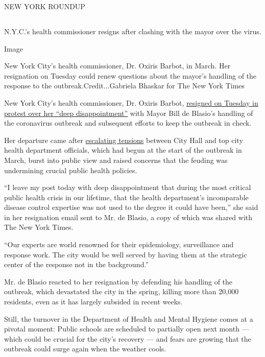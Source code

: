 NEW YORK ROUNDUP

\hypertarget{-6}{%
\subsection{}\label{-6}}

N.Y.C.'s health commissioner resigns after clashing with the mayor over
the virus.

Image

New York City's health commissioner, Dr. Oxiris Barbot, in March. Her
resignation on Tuesday could renew questions about the mayor's handling
of the response to the outbreak.Credit...Gabriela Bhaskar for The New
York Times

New York City's health commissioner, Dr. Oxiris Barbot,
\href{https://www.nytimes3xbfgragh.onion/2020/08/04/nyregion/oxiris-barbot-health-commissioner-resigns.html}{resigned
on Tuesday in protest over her ``deep disappointment''} with Mayor Bill
de Blasio's handling of the coronavirus outbreak and subsequent efforts
to keep the outbreak in check.

Her departure came after
\href{https://www.nytimes3xbfgragh.onion/2020/05/14/nyregion/coronavirus-de-blasio-mitchell-katz.html}{escalating
tensions} between City Hall and top city health department officials,
which had begun at the start of the outbreak in March, burst into public
view and raised concerns that the feuding was undermining crucial public
health policies.

``I leave my post today with deep disappointment that during the most
critical public health crisis in our lifetime, that the health
department's incomparable disease control expertise was not used to the
degree it could have been,'' she said in her resignation email sent to
Mr. de Blasio, a copy of which was shared with The New York Times.

``Our experts are world renowned for their epidemiology, surveillance
and response work. The city would be well served by having them at the
strategic center of the response not in the background.''

Mr. de Blasio reacted to her resignation by defending his handling of
the outbreak, which devastated the city in the spring, killing more than
20,000 residents, even as it has largely subsided in recent weeks.

Still, the turnover in the Department of Health and Mental Hygiene comes
at a pivotal moment: Public schools are scheduled to partially open next
month --- which could be crucial for the city's recovery --- and fears
are growing that the outbreak could surge again when the weather cools.

